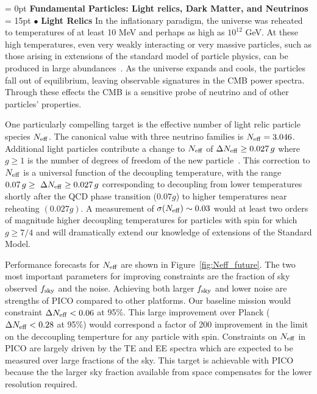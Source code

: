 \documentclass[PICOReport.tex]{subfiles}
\begin{document}
\vspace{0.1in}
\parindent = 0pt
{\bf Fundamental Particles: Light relics, Dark Matter, and Neutrinos} \\ %
\parindent = 15pt
$\bullet$ {\bf Light Relics} \hspace{0.1in} In the inflationary paradigm, the universe was reheated to temperatures of 
at least 10 MeV and perhaps as 
high as $10^{12}$ GeV.  At these high temperatures, even very weakly interacting or very massive particles, 
such as those arising in extensions of the standard model of particle physics, can be produced in large 
abundances~\cite{1979ARNPS..29..313S,Bolz:2000fu}.  As the universe expands and cools, 
the particles fall out of equilibrium, leaving observable signatures in the CMB power spectra. 
Through these effects the CMB is a sensitive probe of neutrino and of other particles' properties.  


One particularly compelling target is the effective number of light relic particle species ${N_{\rm eff}}$.
The canonical value with three neutrino families is ${N_{\rm eff}} = 3.046$. Additional light particles 
contribute a change to ${N_{\rm eff}}$ of $\Delta {N_{\rm eff}} \geq 0.027\,g$ where $g \geq 1$ is the number of 
degrees of freedom of the new particle~\cite{Brust:2013xpv,Baumann:2016wac}.  
This correction to ${N_{\rm eff}}$ is a universal function of the decoupling temperature, with the range 
$ 0.07\,g \geq \ \Delta {N_{\rm eff}} \geq 0.027\,g$ corresponding to decoupling from lower temperatures shortly after the QCD phase 
transition ($0.07g$) to higher temperatures near reheating $(0.027g)$.  A measurement of $\sigma({N_{\rm eff}}) \sim 0.03$ would 
at least two orders of magnitude higher decoupling temperatures for particles with spin for which $g \geq 7/4$ and will dramatically extend our knowledge of extensions of the Standard Model.

Performance forecasts for ${N_{\rm eff}}$ are shown in Figure~\ref{fig:Neff_future}.  The two most important parameters 
for improving constraints are the fraction of sky observed $f_{\rm sky}$ and the noise. Achieving both larger $f_{\rm sky}$ 
and lower noise are strengths of PICO compared to other platforms. 
Our baseline mission would constraint $\Delta {N_{\rm eff}} < 0.06$ at 95\%.  This large improvement over Planck ($\Delta {N_{\rm eff}} < 0.28$ at 95\%) would correspond a factor of 200 improvement in the limit on the deccoupling temperture for any particle with spin.  Constraints on ${N_{\rm eff}}$ in PICO are largely driven by the TE and EE spectra which are expected to be measured over large fractions of the sky.  This target is achievable with PICO because the the larger sky fraction available from space compensates for the lower resolution required.
\end{document}
